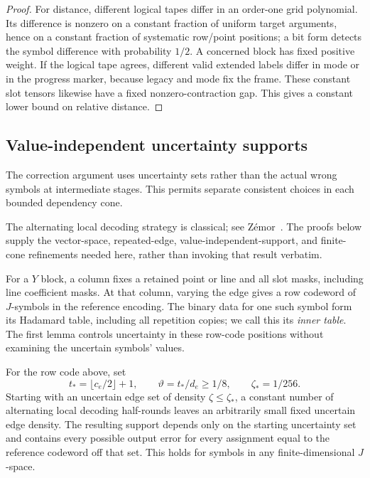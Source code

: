 \begin{proof}
For distance, different logical tapes differ in an order-one grid
polynomial.  Its difference is nonzero on a constant fraction of
uniform target arguments, hence on a constant fraction of systematic
row/point positions; a bit form detects the symbol difference with
probability \(1/2\).  A concerned block has fixed positive weight.
If the logical tape agrees, different valid extended labels differ
in mode or in the progress marker, because legacy and mode fix the
frame.  These constant slot tensors likewise have a fixed
nonzero-contraction gap.  This gives a constant lower bound on
relative distance.
\end{proof}

\subsection{Value-independent uncertainty supports}
\label{ib:uncertainty}

The correction argument uses uncertainty sets rather than the actual
wrong symbols at intermediate stages.  This permits separate
consistent choices in each bounded dependency cone.

The alternating local decoding strategy is classical; see
Z\'emor~\cite[Section~III-A, Lemma~5 and Theorem~6]{Zemor2001}.
The proofs below supply the vector-space, repeated-edge,
value-independent-support, and finite-cone refinements needed here,
rather than invoking that result verbatim.

For a \(Y\) block, a column fixes a retained point or line and all slot
masks, including line coefficient masks. At that column, varying the
edge gives a row codeword of \(J\)-symbols in the reference encoding.
The binary data for one such symbol form its Hadamard table, including
all repetition copies; we call this its \emph{inner table}. The first
lemma controls uncertainty in these row-code positions without examining
the uncertain symbols' values.

\begin{lemma}
\label{ib:one-axis-support}
For the row code above, set
\[
 t_* =\lfloor c_e/2\rfloor+1,\qquad
 \vartheta=t_*/d_e\ge1/8,\qquad \zeta_*=1/256.
\]
Starting with an uncertain edge set of density
\(\zeta\le\zeta_*\), a constant number of alternating local
decoding half-rounds leaves an arbitrarily small fixed uncertain
edge density.  The resulting support depends only on the starting
uncertainty set and contains every possible output error for every
assignment equal to the reference codeword off that set.  This holds
for symbols in any finite-dimensional \(J\)-space.
\end{lemma}


